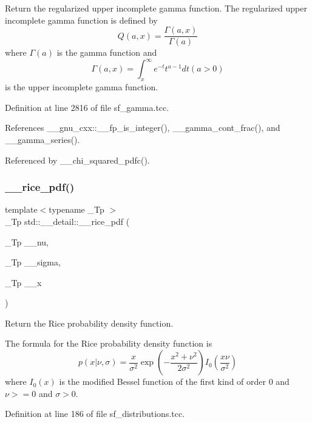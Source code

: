 Return the regularized upper incomplete gamma function. The regularized upper incomplete gamma function is defined by \[ Q(a,x) = \frac{\Gamma(a,x)}{\Gamma(a)} \] where $ \Gamma(a) $ is the gamma function and \[ \Gamma(a,x) = \int_x^\infty e^{-t}t^{a-1}dt (a > 0) \] is the upper incomplete gamma function. 



Definition at line 2816 of file sf\+\_\+gamma.\+tcc.



References \+\_\+\+\_\+gnu\+\_\+cxx\+::\+\_\+\+\_\+fp\+\_\+is\+\_\+integer(), \+\_\+\+\_\+gamma\+\_\+cont\+\_\+frac(), and \+\_\+\+\_\+gamma\+\_\+series().



Referenced by \+\_\+\+\_\+chi\+\_\+squared\+\_\+pdfc().

\mbox{\label{namespacestd_1_1____detail_a571f37fdf793a91985073a58a873e731}} 
\subsubsection{\texorpdfstring{\+\_\+\+\_\+rice\+\_\+pdf()}{\_\_rice\_pdf()}}
{\footnotesize\ttfamily template$<$typename \+\_\+\+Tp $>$ \\
\+\_\+\+Tp std\+::\+\_\+\+\_\+detail\+::\+\_\+\+\_\+rice\+\_\+pdf (\begin{DoxyParamCaption}\item[{\+\_\+\+Tp}]{\+\_\+\+\_\+nu,  }\item[{\+\_\+\+Tp}]{\+\_\+\+\_\+sigma,  }\item[{\+\_\+\+Tp}]{\+\_\+\+\_\+x }\end{DoxyParamCaption})}



Return the Rice probability density function. 

The formula for the Rice probability density function is \[ p(x|\nu,\sigma) = \frac{x}{\sigma^2} \exp\left(-\frac{x^2+\nu^2}{2\sigma^2}\right) I_0\left(\frac{x \nu}{\sigma^2}\right) \] where $I_0(x)$ is the modified Bessel function of the first kind of order 0 and $\nu >= 0$ and $\sigma > 0$. 

Definition at line 186 of file sf\+\_\+distributions.\+tcc.



